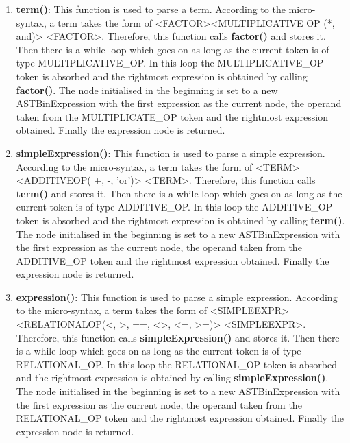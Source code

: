 \documentclass{article}
\begin{document}
\begin{enumerate}
				\item \textbf{term()}: This function is used to parse a term. According to the micro-syntax, a term takes the form of \textless FACTOR\textgreater {\textless MULTIPLICATIVE OP (*, \, and)\textgreater} \textless FACTOR\textgreater. Therefore, this function calls \textbf{factor()} and stores it. Then there is a while loop which goes on as long as the current token is of type MULTIPLICATIVE\_OP. In this loop the MULTIPLICATIVE\_OP token is absorbed and the rightmost expression is obtained by calling \textbf{factor()}. The node initialised in the beginning is set to a new ASTBinExpression with the first expression as the current node, the operand taken from the MULTIPLICATE\_OP token and the rightmost expression obtained. Finally the expression node is returned.
				
					\item \textbf{simpleExpression()}: This function is used to parse a simple expression. According to the micro-syntax, a term takes the form of \textless TERM\textgreater {\textless ADDITIVEOP( +, -, 'or')\textgreater} \textless TERM\textgreater. Therefore, this function calls \textbf{term()} and stores it. Then there is a while loop which goes on as long as the current token is of type ADDITIVE\_OP. In this loop the ADDITIVE\_OP token is absorbed and the rightmost expression is obtained by calling \textbf{term()}. The node initialised in the beginning is set to a new ASTBinExpression with the first expression as the current node, the operand taken from the ADDITIVE\_OP token and the rightmost expression obtained. Finally the expression node is returned.
			
						\item \textbf{expression()}: This function is used to parse a simple expression. According to the micro-syntax, a term takes the form of \textless SIMPLEEXPR\textgreater {\textless RELATIONALOP(<, >, ==, <>, <=, >=)\textgreater} \textless SIMPLEEXPR\textgreater. Therefore, this function calls \textbf{simpleExpression()} and stores it. Then there is a while loop which goes on as long as the current token is of type RELATIONAL\_OP. In this loop the RELATIONAL\_OP token is absorbed and the rightmost expression is obtained by calling \textbf{simpleExpression()}. The node initialised in the beginning is set to a new ASTBinExpression with the first expression as the current node, the operand taken from the RELATIONAL\_OP token and the rightmost expression obtained. Finally the expression node is returned.
			

\end{enumerate}
\end{document}
